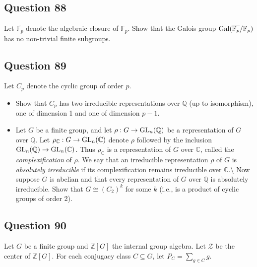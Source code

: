 \documentclass[12pt]{article}
\begin{document}
\hypertarget{question-88}{%
\subsection{Question 88}\label{question-88}}

Let \(\overline{\mathbb F_p}\) denote the algebraic closure of
\(\mathbb F_p\). Show that the Galois group
\(\mathrm{Gal}(\overline{\mathbb F_p}/\mathbb F_p)\) has no non-trivial finite
subgroups.

\hypertarget{question-89}{%
\subsection{Question 89}\label{question-89}}

Let \(C_p\) denote the cyclic group of order \(p\).

\begin{itemize}
\item
  Show that \(C_p\) has two irreducible representations over
  \(\mathbb Q\) (up to isomorphism), one of dimension 1 and one of
  dimension \(p-1\).
\item
  Let \(G\) be a finite group, and let
  \(\rho:G\rightarrow {\text{GL}}_n(\mathbb Q)\) be a representation of \(G\)
  over \(\mathbb Q\). Let
  \(\rho_{\mathbb C}:G\rightarrow{\text{GL}}_n(\mathbb C)\) denote \(\rho\)
  followed by the inclusion
  \({\text{GL}}_n(\mathbb Q)\rightarrow {\text{GL}}_n(\mathbb C)\). Thus
  \(\rho_{\mathbb C}\) is a representation of \(G\) over \(\mathbb C\),
  called the \textit{complexification} of \(\rho\). We say that an
  irreducible representation \(\rho\) of \(G\) is
  \textit{absolutely irreducible} if its complexification remains
  irreducible over \(\mathbb C\).\textbackslash{} Now suppose \(G\) is
  abelian and that every representation of \(G\) over \(\mathbb Q\) is
  absolutely irreducible. Show that \(G\cong(C_2)^k\) for some \(k\)
  (i.e., is a product of cyclic groups of order 2).
\end{itemize}

\hypertarget{question-90}{%
\subsection{Question 90}\label{question-90}}

Let \(G\) be a finite group and \(\mathbb Z[G]\) the internal group
algebra. Let \(\mathcal Z\) be the center of \(\mathbb Z[G]\). For each
conjugacy class \(C\subseteq G\), let \(P_C=\sum_{g\in C}g\).
\end{document}
